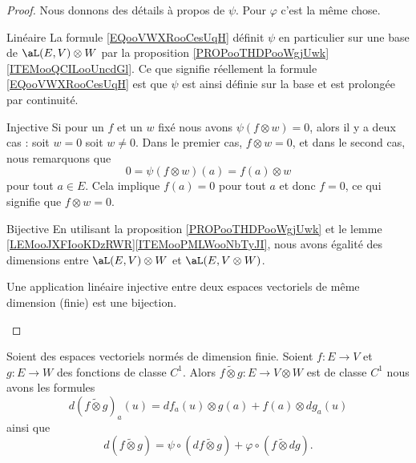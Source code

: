 \begin{proof}
    Nous donnons des détails à propos de \( \psi\). Pour \( \varphi\) c'est la même chose.
    \begin{subproof}
        \item[Linéaire]
            La formule \eqref{EQooVWXRooCesUqH} définit \( \psi\) en particulier sur une base de \( \aL(E,V)\otimes W\) par la proposition \ref{PROPooTHDPooWgjUwk}\ref{ITEMooQCILooUncdGl}. Ce que signifie réellement la formule \eqref{EQooVWXRooCesUqH} est que \( \psi\) est ainsi définie sur la base et est prolongée par continuité.
        \item[Injective]
            Si pour un \( f\) et un \( w\) fixé nous avons \( \psi(f\otimes w)=0\), alors il y a deux cas : soit \( w=0\) soit \( w\neq0\). Dans le premier cas, \( f\otimes w=0\), et dans le second cas, nous remarquons que 
            \begin{equation}
                0=\psi(f\otimes w)(a)=f(a)\otimes w
            \end{equation}
            pour tout \( a\in E\). Cela implique \( f(a)=0\) pour tout \( a\) et donc \( f=0\), ce qui signifie que \( f\otimes w=0\).
        \item[Bijective]
            En utilisant la proposition \ref{PROPooTHDPooWgjUwk} et le lemme \ref{LEMooJXFIooKDzRWR}\ref{ITEMooPMLWooNbTyJI}, nous avons égalité des dimensions entre \( \aL(E,V)\otimes W\) et \( \aL(E,V\otimes W)\).

            Une application linéaire injective entre deux espaces vectoriels de même dimension (finie) est une bijection.
    \end{subproof}
\end{proof}

\begin{proposition}     \label{PROPooZOAFooRMeBgI}
    Soient des espaces vectoriels normés de dimension finie. Soient \( f\colon E\to V\) et \( g\colon E\to W\) des fonctions de classe \( C^1\). Alors \( f\tilde\otimes g\colon E\to V\otimes W\) est de classe \( C^1\) nous avons les formules
    \begin{equation}        \label{EQooSUSCooBhZXFC}
        d(f\tilde\otimes g)_a(u)=df_a(u)\otimes g(a)+f(a)\otimes dg_a(u)
    \end{equation}
    ainsi que
    \begin{equation}        \label{EQooOCEEooUrsIDd}
        d(f\tilde\otimes g)=\psi\circ(df\tilde\otimes g)+\varphi\circ(f\tilde\otimes dg).
    \end{equation}
\end{proposition}

